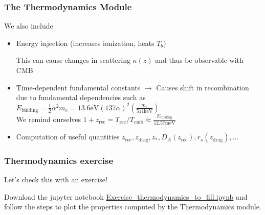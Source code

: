 \begin{frame}[fragile]
	\frametitle{The Thermodynamics Module}

	We also include
	\begin{itemize}
		\item Energy injection (increases ionization, heats $T_b$)

		This can cause changes in scattering $\kappa(z)$ and thus be observable with CMB
		\item Time-dependent fundamental constants $\to$ Causes shift in recombination due to fundamental dependencies such as $E_\mathrm{binding} = \frac{1}{2}\alpha^2 m_e= 13.6\mathrm{eV} \left(137 \alpha\right)^2 \left(\frac{m_e}{511\mathrm{keV}}\right)$
		\\
		We remind ourselves $1+z_\mathrm{rec} = T_\mathrm{rec}/T_\mathrm{cmb} \approx \frac{E_\mathrm{binding}}{12.57\mathrm{meV}}$
		\item Computation of useful quantities $z_\mathrm{rec}, z_\mathrm{drag}, z_*, D_A(z_\mathrm{rec}), r_s(z_\mathrm{drag}), ...$
	\end{itemize}
\end{frame}

\begin{frame}[fragile]
	\frametitle{Thermodynamics exercise}
Let's check this with an exercise!

Download the jupyter notebook \href{https://github.com/MarkMos/class_lecture/blob/main/notebooks/Exercise_thermodynamics_to_fill.ipynb}{Exercise\_thermodynamics\_to\_fill.ipynb} and follow the steps to plot the properties computed by the Thermodynamics module.


\end{frame}



